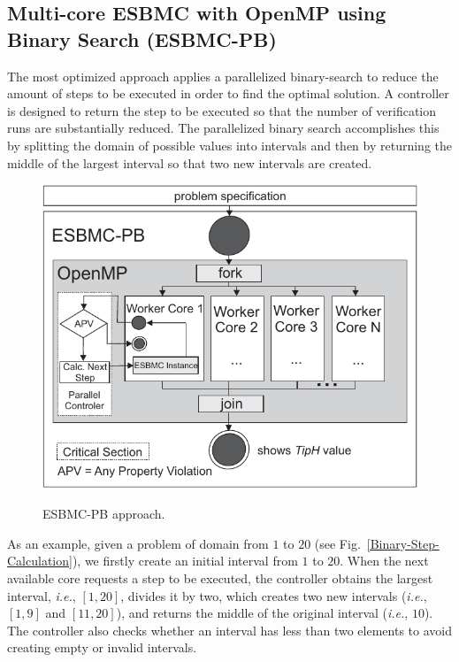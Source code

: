 \documentclass{doublecol-new}
\theoremstyle{TH}{
\newtheorem{lemma}{Lemma}
\newtheorem{theorem}[lemma]{Theorem}
\newtheorem{corrolary}[lemma]{Corrolary}
\newtheorem{conjecture}[lemma]{Conjecture}
\newtheorem{proposition}[lemma]{Proposition}
\newtheorem{claim}[lemma]{Claim}
\newtheorem{stheorem}[lemma]{Wrong Theorem}
\newtheorem{algorithm}{Algorithm}
}
\theoremstyle{THrm}{
\newtheorem{definition}{Definition}[section]
\newtheorem{question}{Question}[section]
\newtheorem{remark}{Remark}
\newtheorem{scheme}{Scheme}
}
\theoremstyle{THhit}{
\newtheorem{case}{Case}[section]
}
\begin{document}

\subsection{Multi-core ESBMC with OpenMP using Binary Search (ESBMC-PB)}
\label{Multi-core-ESBMC-with-OpenMP-using-Binary-Search}

The most optimized approach applies a parallelized binary-search to reduce the amount of steps to be executed in order to find the optimal solution. A controller is designed to return the step to be executed so that the number of verification runs are substantially reduced. The parallelized binary search accomplishes this by splitting the domain of possible values into intervals and then by returning the middle of the largest interval so that two new intervals are created.

\begin{figure}[ht]
	\caption{ESBMC-PB approach.}
	\centering
	\includegraphics[scale=0.77]{figures/esbmc-pb.pdf} 
	\label{ESBMC-Binary-Approach}
\end{figure}

As an example, given a problem of domain from $1$ to $20$ (see Fig.~\ref{Binary-Step-Calculation}), we firstly create an initial interval from $1$ to $20$. When the next available core requests a step to be executed, the controller obtains the largest interval, {\it i.e.}, $\left[1,20\right]$, divides it by two, which creates two new intervals ({\it i.e.}, $\left[1,9\right]$ and $\left[11,20\right]$), and returns the middle of the original interval ({\it i.e.}, $10$). The controller also checks whether an interval has less than two elements to avoid creating empty or invalid intervals.
\end{document}
